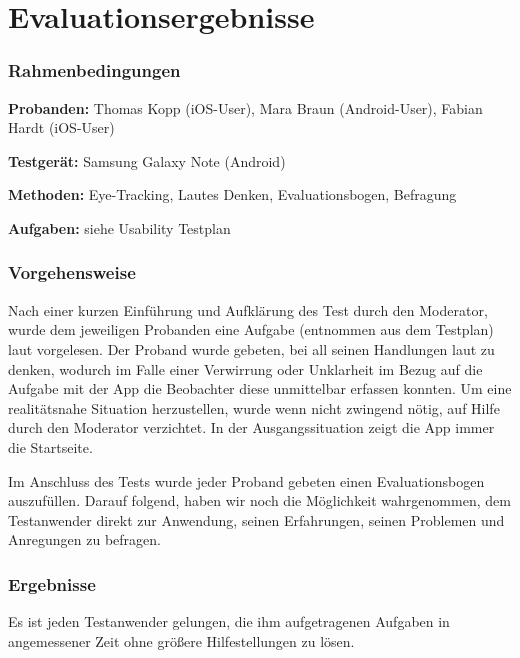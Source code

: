 \section{Evaluationsergebnisse}

\subsubsection*{Rahmenbedingungen}
\textbf{Probanden:} Thomas Kopp (iOS-User), Mara Braun (Android-User), Fabian Hardt (iOS-User)

\textbf{Testgerät:} Samsung Galaxy Note (Android)

\textbf{Methoden:} Eye-Tracking, Lautes Denken, Evaluationsbogen, Befragung

\textbf{Aufgaben:} siehe Usability Testplan

\subsubsection*{Vorgehensweise}

Nach einer kurzen Einführung und Aufklärung des Test durch den Moderator, wurde dem jeweiligen Probanden eine Aufgabe (entnommen aus dem Testplan) laut vorgelesen. Der Proband wurde gebeten, bei all seinen Handlungen laut zu denken, wodurch im Falle einer Verwirrung oder Unklarheit im Bezug auf die Aufgabe mit der App die Beobachter diese unmittelbar erfassen konnten. Um eine realitätsnahe Situation herzustellen, wurde wenn nicht zwingend nötig, auf Hilfe durch den Moderator verzichtet. In der Ausgangssituation zeigt die App immer die Startseite.

Im Anschluss des Tests wurde jeder Proband gebeten einen Evaluationsbogen auszufüllen. Darauf folgend, haben wir noch die Möglichkeit wahrgenommen, dem Testanwender direkt zur Anwendung, seinen Erfahrungen, seinen Problemen und Anregungen zu befragen.
\newpage
\subsubsection*{Ergebnisse}

Es ist jeden Testanwender gelungen, die ihm aufgetragenen Aufgaben in angemessener Zeit ohne größere Hilfestellungen zu lösen.

